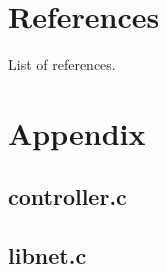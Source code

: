 \documentclass{article}
\begin{document}
\section*{References}
List of references.

\section*{Appendix}

\subsection*{controller.c}


\subsection*{libnet.c}

\end{document}
